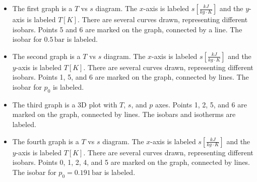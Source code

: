 \begin{itemize}
    \item The first graph is a $T$ vs $s$ diagram. The $x$-axis is labeled $s \left[\frac{kJ}{kg \cdot K}\right]$ and the $y$-axis is labeled $T \left[K\right]$. There are several curves drawn, representing different isobars. Points 5 and 6 are marked on the graph, connected by a line. The isobar for $0.5 \, \text{bar}$ is labeled.
    
    \item The second graph is a $T$ vs $s$ diagram. The $x$-axis is labeled $s \left[\frac{kJ}{kg \cdot K}\right]$ and the $y$-axis is labeled $T \left[K\right]$. There are several curves drawn, representing different isobars. Points 1, 5, and 6 are marked on the graph, connected by lines. The isobar for $p_0$ is labeled.
    
    \item The third graph is a 3D plot with $T$, $s$, and $p$ axes. Points 1, 2, 5, and 6 are marked on the graph, connected by lines. The isobars and isotherms are labeled.
    
    \item The fourth graph is a $T$ vs $s$ diagram. The $x$-axis is labeled $s \left[\frac{kJ}{kg \cdot K}\right]$ and the $y$-axis is labeled $T \left[K\right]$. There are several curves drawn, representing different isobars. Points 0, 1, 2, 4, and 5 are marked on the graph, connected by lines. The isobar for $p_0 = 0.191 \, \text{bar}$ is labeled.
\end{itemize}
